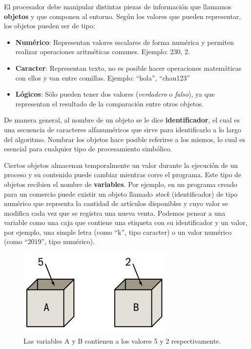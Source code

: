 \documentclass[
]{book}
\providecommand{\tightlist}{%
  \setlength{\itemsep}{0pt}\setlength{\parskip}{0pt}}
\begin{document}
El procesador debe manipular distintas piezas de información que llamamos \textbf{objetos} y que componen al entorno. Según los valores que pueden representar, los objetos pueden ser de tipo:

\begin{itemize}
\tightlist
\item
  \textbf{Numérico}: Representan valores escalares de forma numérica y permiten realizar
  operaciones aritméticas comunes. Ejemplo: 230, 2.
\item
  \textbf{Caracter}: Representan texto, no es posible hacer operaciones
  matemáticas con ellos y van entre comillas. Ejemplo: ``hola'', ``chau123''
\item
  \textbf{Lógicos}: Sólo pueden tener dos valores (\emph{verdadero} o \emph{falso}), ya que representan el resultado de la comparación entre otros objetos.
\end{itemize}

De manera general, al nombre de un objeto se le dice \textbf{identificador}, el cual es una secuencia de caracteres alfanuméricos que sirve para identificarlo a lo largo del algoritmo. Nombrar los objetos hace posible referirse a los mismos, lo cual es esencial para cualquier tipo de procesamiento simbólico.

Ciertos objetos almacenan temporalmente un valor durante la ejecución de un proceso y su contenido puede cambiar mientras corre el programa. Este tipo de objetos recibien el nombre de \textbf{variables}. Por ejemplo, en un programa creado para un comercio puede existir un objeto llamado \emph{stock} (identificador) de tipo numérico que reprsenta la cantidad de artículos disponibles y cuyo valor se modifica cada vez que se registra una nueva venta. Podemos pensar a una variable como una caja que contiene una etiqueta con su identificador y un valor, por ejemplo, una simple letra (como ``k'', tipo caracter) o un valor numérico (como ``2019'', tipo numérico).

\begin{figure}

{\centering \includegraphics[width=0.5\linewidth]{images/09_cajas} 

}

\caption{Las variables A y B contienen a los valores 5 y 2 respectivamente.}\label{fig:cajas}
\end{figure}
\end{document}
